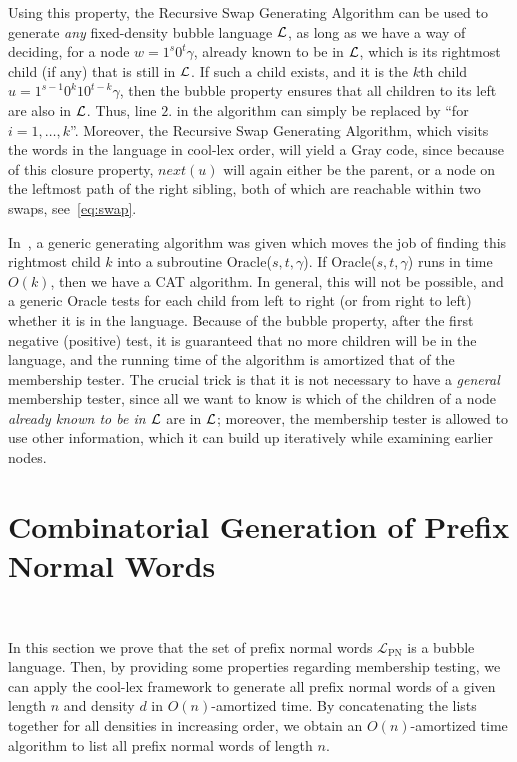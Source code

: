 \documentclass[11pt,a4paper]{llncs}
\newcommand{\LPN}{{\mathcal L}_{\textrm{PN}}}
\begin{document}
Using this property, the Recursive Swap Generating Algorithm can be used to generate {\em any} fixed-density bubble language ${\cal L}$, as long as we have a way of deciding, for a node $w=1^s0^t\gamma$, already known to be in ${\cal L}$, which is its rightmost child (if any) that is still in ${\cal L}$. If such a child exists, and it is the $k$th child $u=1^{s-1}0^k10^{t-k}\gamma$, then the bubble property ensures that all children to its left are also in ${\cal L}$. Thus, line $2.$ in the algorithm can simply be replaced by ``for $i=1,\ldots,k$''. Moreover, the Recursive Swap Generating Algorithm, which visits the words in the language in cool-lex order, will yield a Gray code, since because of this closure property, $next(u)$ will again either be the parent, or a node on the leftmost path of the right sibling, both of which are reachable within two swaps, see~\eqref{eq:swap}.

In~\cite{SW12}, a generic generating algorithm was given which moves the job of finding this rightmost child $k$ into a subroutine Oracle($s,t,\gamma$). If Oracle($s,t,\gamma$) runs in time $O(k)$, then we have a CAT algorithm. In general, this will not be possible, and a generic Oracle  tests for each child from left to right (or from right to left) whether it is in the language. Because of the bubble property, after the first negative (positive) test, it is guaranteed that no more children will be in the language, and the running time of the algorithm is amortized that of the membership tester. The crucial trick is  that it is not necessary to have a {\em general} membership tester, since all we want to know is which of the children of a node {\em already known to be in ${\cal L}$} are in ${\cal L}$; moreover, the membership tester is allowed to use other information, which it can build up iteratively while examining earlier nodes.

\section{Combinatorial Generation of Prefix Normal Words}~\label{sec:combgenpnw}


In this section we prove that the set of prefix normal words $\LPN$ is a bubble language.  Then, by providing some properties regarding membership testing, we can apply the cool-lex framework to generate all prefix normal words of a given length $n$ and density $d$ in $O(n)$-amortized time.  By concatenating the lists together for all densities in increasing order, we obtain an $O(n)$-amortized time algorithm to list all prefix normal words of length $n$.
\end{document}
